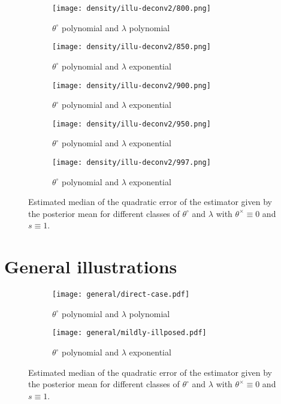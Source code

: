 \begin{figure}
\centering
\begin{subfigure}{.4\textwidth}
  \centering
  \texttt{[image: density/illu-deconv2/800.png]}
  \caption{$\theta^{\circ}$ polynomial and $\lambda$ polynomial}
  \label{fig3:sub1}
\end{subfigure}%
\begin{subfigure}{.4\textwidth}
  \centering
  \texttt{[image: density/illu-deconv2/850.png]}
  \caption{$\theta^{\circ}$ polynomial and $\lambda$ exponential}
  \label{fig3:sub2}
\end{subfigure}

\begin{subfigure}{.4\textwidth}
  \centering
  \texttt{[image: density/illu-deconv2/900.png]}
  \caption{$\theta^{\circ}$ polynomial and $\lambda$ exponential}
  \label{fig3:sub2}
\end{subfigure}
\begin{subfigure}{.4\textwidth}
  \centering
  \texttt{[image: density/illu-deconv2/950.png]}
  \caption{$\theta^{\circ}$ polynomial and $\lambda$ exponential}
  \label{fig3:sub2}
\end{subfigure}

\begin{subfigure}{.4\textwidth}
  \centering
  \texttt{[image: density/illu-deconv2/997.png]}
  \caption{$\theta^{\circ}$ polynomial and $\lambda$ exponential}
  \label{fig3:sub2}
\end{subfigure}
\caption{Estimated median of the quadratic error of the estimator given by the posterior mean for different classes of $\theta^{\circ}$ and $\lambda$ with $\theta^{\times} \equiv 0$ and $s \equiv 1$.}
\label{EQM}
\end{figure}

\section{General illustrations}\label{D.3}

\begin{figure}
\centering
\begin{subfigure}{.5\textwidth}
  \centering
  \texttt{[image: general/direct-case.pdf]}
  \caption{$\theta^{\circ}$ polynomial and $\lambda$ polynomial}
  \label{fig3:sub1}
\end{subfigure}%
\begin{subfigure}{.5\textwidth}
  \centering
  \texttt{[image: general/mildly-illposed.pdf]}
  \caption{$\theta^{\circ}$ polynomial and $\lambda$ exponential}
  \label{fig3:sub2}
\end{subfigure}
\caption{Estimated median of the quadratic error of the estimator given by the posterior mean for different classes of $\theta^{\circ}$ and $\lambda$ with $\theta^{\times} \equiv 0$ and $s \equiv 1$.}
\label{EQM}
\end{figure}







